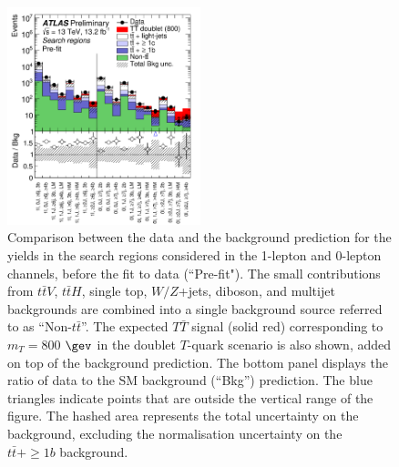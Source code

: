\begin{figure}[htb!]
\centering
\includegraphics[width=0.5\textwidth]{figures/VLQ/fig_08.png}
\captionsetup{width=0.85\textwidth}  \caption{\small Comparison between the data and the background prediction for the yields in the search regions considered  in the 1-lepton and 0-lepton channels, before the fit to data (``Pre-fit"). The small contributions from $t\bar{t}V$, $t\bar{t}H$, single top, $W/Z$+jets, diboson, and multijet backgrounds are combined into a single background source referred to as ``Non-$t\bar{t}$''. The expected $T\bar{T}$ signal (solid red) corresponding to $m_{T}=800$ $\gev$ in the doublet $T$-quark scenario is also shown,  added on top of the background prediction. The bottom panel displays the ratio of data to the SM background (``Bkg'') prediction.  The blue triangles indicate points that are outside the vertical range of the figure. The hashed area represents the total uncertainty on the background, excluding the normalisation uncertainty on the $t\bar{t}+\ge1b$ background.}
\label{sec:vlq:fig:prefityields}
\end{figure}

